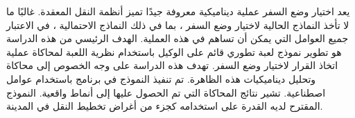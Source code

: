\documentclass[11pt,a4paper]{report}
\begin{document}
\begin{center}


\begin{otherlanguage}{arabic}
يعد اختيار وضع السفر عملية ديناميكية معروفة جيدًا تميز أنظمة النقل المعقدة. غالبًا ما لا تأخذ النماذج الحالية لاختيار وضع السفر ، بما في ذلك النماذج الاحتمالية ، في الاعتبار جميع العوامل التي يمكن أن تساهم في هذه العملية. الهدف الرئيسي من هذه الدراسة هو تطوير نموذج لعبة تطوري قائم على الوكيل باستخدام نظرية اللعبة لمحاكاة عملية اتخاذ القرار لاختيار وضع السفر. تهدف هذه الدراسة على وجه الخصوص إلى محاكاة وتحليل ديناميكيات هذه الظاهرة. تم تنفيذ النموذج في برنامج   باستخدام عوامل اصطناعية. تشير نتائج المحاكاة التي تم الحصول عليها إلى أنماط واقعية. النموذج المقترح لديه القدرة على استخدامه كجزء من أغراض تخطيط النقل في المدينة. 
\end{otherlanguage}
\end{center}
       
\end{document}
